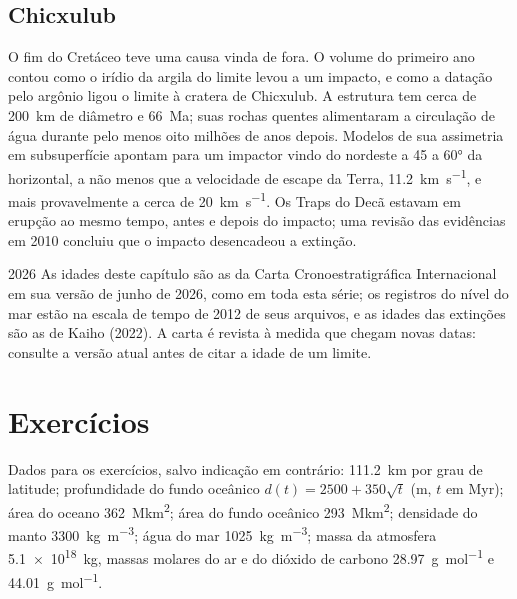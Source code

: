 \subsection*{Chicxulub}

O fim do Cretáceo teve uma causa vinda de fora. O volume do primeiro ano contou como o irídio da
argila do limite levou a um impacto, e como a datação pelo argônio ligou o limite à cratera de Chicxulub.
A estrutura tem cerca de \qty{200}{km} de diâmetro e \qty{66}{Ma}; suas
rochas quentes alimentaram a circulação de água durante pelo menos oito milhões de anos depois. Modelos de sua assimetria
em subsuperfície apontam para um impactor vindo do nordeste a 45 a \ang{60} da horizontal,
a não menos que a velocidade de escape da Terra, \qty{11.2}{km.s^{-1}}, e mais provavelmente a cerca de
\qty{20}{km.s^{-1}}. Os Traps do Decã estavam em erupção ao mesmo tempo, antes e depois do
impacto; uma revisão das evidências em 2010 concluiu que o impacto desencadeou a extinção.

\begin{dated}{2026}
As idades deste capítulo são as da Carta Cronoestratigráfica Internacional em sua versão de junho
de 2026, como em toda esta série; os registros do nível do mar estão na escala de tempo de 2012
de seus arquivos, e as idades das extinções são as de Kaiho (2022). A carta é revista à medida que chegam
novas datas: consulte a versão atual antes de citar a idade de um limite.
\end{dated}

\section*{Exercícios}\label{sec:b2:phanerozoic-earth:exercises}

Dados para os exercícios, salvo indicação em contrário: \qty{111.2}{km} por grau de latitude; profundidade
do fundo oceânico $d(t) = 2500 + 350\sqrt t$ (\unit{m}, $t$ em \unit{Myr}); área do oceano
\qty{362}{\mega km^2}; área do fundo oceânico \qty{293}{\mega km^2}; densidade do manto
\qty{3300}{kg.m^{-3}}; água do mar \qty{1025}{kg.m^{-3}}; massa da atmosfera
\qty{5.1e18}{kg}, massas molares do ar e do dióxido de carbono \qty{28.97}{g.mol^{-1}} e
\qty{44.01}{g.mol^{-1}}.

